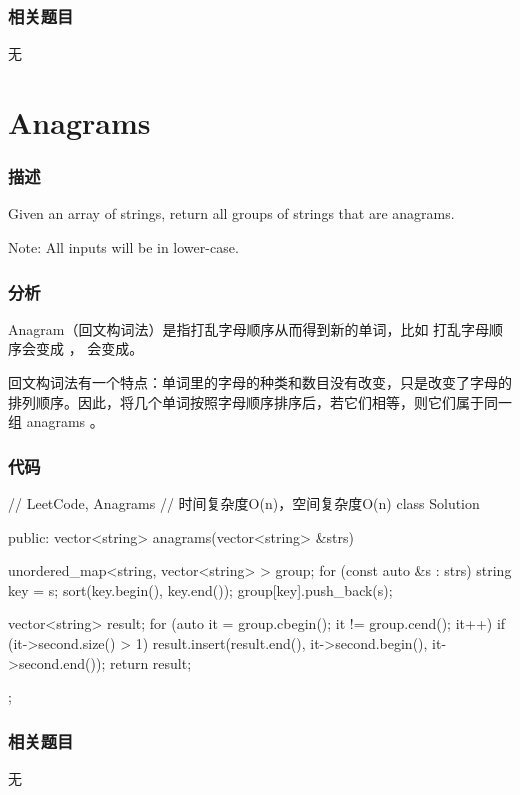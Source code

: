 \subsubsection{相关题目}
\begindot
\item 无
\myenddot


\section{Anagrams} %
\label{sec:anagrams}


\subsubsection{描述}
Given an array of strings, return all groups of strings that are anagrams.

Note: All inputs will be in lower-case.


\subsubsection{分析}
Anagram（回文构词法）是指打乱字母顺序从而得到新的单词，比如  打乱字母顺序会变成  ， 会变成。

回文构词法有一个特点：单词里的字母的种类和数目没有改变，只是改变了字母的排列顺序。因此，将几个单词按照字母顺序排序后，若它们相等，则它们属于同一组 anagrams 。


\subsubsection{代码}
\begin{Code}
// LeetCode, Anagrams
// 时间复杂度O(n)，空间复杂度O(n)
class Solution {
public:
    vector<string> anagrams(vector<string> &strs) {
        unordered_map<string, vector<string> > group;
        for (const auto &s : strs) {
            string key = s;
            sort(key.begin(), key.end());
            group[key].push_back(s);
        }

        vector<string> result;
        for (auto it = group.cbegin(); it != group.cend(); it++) {
            if (it->second.size() > 1)
                result.insert(result.end(), it->second.begin(), it->second.end());
        }
        return result;
    }
};
\end{Code}


\subsubsection{相关题目}
\begindot
\item 无
\myenddot


